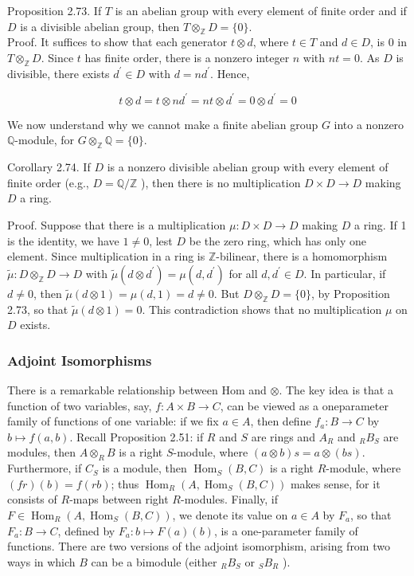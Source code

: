 \documentclass[10pt, letterpaper]{article}
\begin{document}
Proposition 2.73. If $T$ is an abelian group with every element of finite order and if $D$ is a divisible abelian group, then $T \otimes_{\mathbb{Z}} D=\{0\}$.\\
Proof. It suffices to show that each generator $t \otimes d$, where $t \in T$ and $d \in D$, is 0 in $T \otimes_{\mathbb{Z}} D$. Since $t$ has finite order, there is a nonzero integer $n$ with $n t=0$. As $D$ is divisible, there exists $d^{\prime} \in D$ with $d=n d^{\prime}$. Hence,

$$
t \otimes d=t \otimes n d^{\prime}=n t \otimes d^{\prime}=0 \otimes d^{\prime}=0
$$

We now understand why we cannot make a finite abelian group $G$ into a nonzero $\mathbb{Q}$-module, for $G \otimes_{\mathbb{Z}} \mathbb{Q}=\{0\}$.

Corollary 2.74. If $D$ is a nonzero divisible abelian group with every element of finite order (e.g., $D=\mathbb{Q} / \mathbb{Z}$ ), then there is no multiplication $D \times D \rightarrow D$ making $D$ a ring.

Proof. Suppose that there is a multiplication $\mu: D \times D \rightarrow D$ making $D$ a ring. If 1 is the identity, we have $1 \neq 0$, lest $D$ be the zero ring, which has only one element. Since multiplication in a ring is $\mathbb{Z}$-bilinear, there is a homomorphism $\tilde{\mu}: D \otimes_{\mathbb{Z}} D \rightarrow D$ with $\tilde{\mu}\left(d \otimes d^{\prime}\right)=\mu\left(d, d^{\prime}\right)$ for all $d, d^{\prime} \in D$. In particular, if $d \neq 0$, then $\widetilde{\mu}(d \otimes 1)=\mu(d, 1)=d \neq 0$. But $D \otimes_{\mathbb{Z}} D=\{0\}$, by Proposition 2.73, so that $\widetilde{\mu}(d \otimes 1)=0$. This contradiction shows that no multiplication $\mu$ on $D$ exists.

\subsubsection*{Adjoint Isomorphisms}
There is a remarkable relationship between Hom and $\otimes$. The key idea is that a function of two variables, say, $f: A \times B \rightarrow C$, can be viewed as a oneparameter family of functions of one variable: if we fix $a \in A$, then define $f_{a}: B \rightarrow C$ by $b \mapsto f(a, b)$. Recall Proposition 2.51: if $R$ and $S$ are rings and $A_{R}$ and ${ }_{R} B_{S}$ are modules, then $A \otimes_{R} B$ is a right $S$-module, where $(a \otimes b) s=a \otimes(b s)$. Furthermore, if $C_{S}$ is a module, then $\operatorname{Hom}_{S}(B, C)$ is a right $R$-module, where $(f r)(b)=f(r b)$; thus $\operatorname{Hom}_{R}\left(A, \operatorname{Hom}_{S}(B, C)\right)$ makes sense, for it consists of $R$-maps between right $R$-modules. Finally, if $F \in \operatorname{Hom}_{R}\left(A, \operatorname{Hom}_{S}(B, C)\right)$, we denote its value on $a \in A$ by $F_{a}$, so that $F_{a}: B \rightarrow C$, defined by $F_{a}: b \mapsto F(a)(b)$, is a one-parameter family of functions. There are two versions of the adjoint isomorphism, arising from two ways in which $B$ can be a bimodule (either ${ }_{R} B_{S}$ or ${ }_{S} B_{R}$ ).
\end{document}
